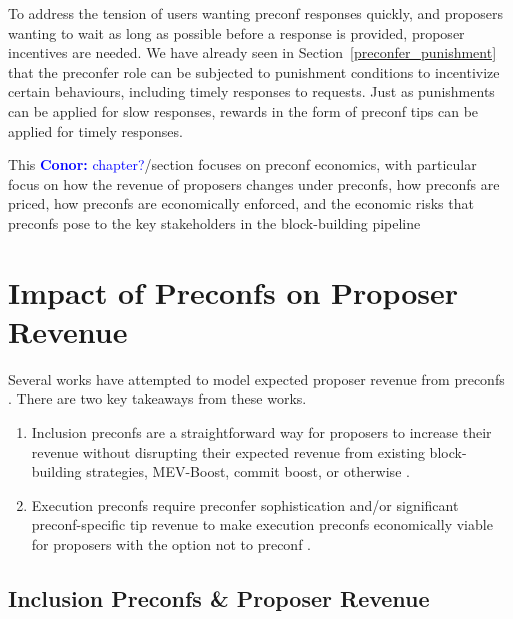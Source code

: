 \documentclass[a4paper]{article}
\theoremstyle{boldstyle}
\newcommand{\cm}[1]{\textcolor{blue}{\textbf{Conor:} #1}}
\newcommand{\todocm}[1]{\todo[color=blue!40]{\textbf{Conor:} #1}}
\begin{document}
    To address the tension of users wanting preconf responses quickly, and proposers wanting to wait as long as possible before a response is provided, proposer incentives are needed. We have already seen in Section~\ref{preconfer_punishment} that the preconfer role can be subjected to punishment conditions to incentivize certain behaviours, including timely responses to requests. Just as punishments can be applied for slow responses, rewards in the form of preconf tips can be applied for timely responses. 

    This \cm{chapter?}/section focuses on preconf economics, with particular focus on how the revenue of proposers changes under preconfs, how preconfs are priced, how preconfs are economically enforced, and the economic risks that preconfs pose to the key stakeholders in the block-building pipeline
\section{Impact of Preconfs on Proposer Revenue}
    
     Several works have attempted to model expected proposer revenue from preconfs\cite{W:PreconfirmationsundertheNOlens,W:EstimatingtheRevenuefromIndependentSub-SlotAuctionPreconfirmations,W:AnalysingExpectedProposerRevenuefromPreconfirmations,W:APricingModelforInclusionPreconfirmations} \todocm{identify other pricing works}. There are two key takeaways from these works.
     
     \begin{enumerate}
         \item Inclusion preconfs are a straightforward way for proposers to increase their revenue without disrupting their expected revenue from existing block-building strategies, MEV-Boost, commit boost, or otherwise \cite{W:APricingModelforInclusionPreconfirmations}.
         \item Execution preconfs require preconfer sophistication and/or significant preconf-specific tip revenue to make execution preconfs economically viable for proposers with the option not to preconf \cite{W:PreconfirmationsundertheNOlens,W:EstimatingtheRevenuefromIndependentSub-SlotAuctionPreconfirmations,W:AnalysingExpectedProposerRevenuefromPreconfirmations}. 
     \end{enumerate}
    
    \subsection{Inclusion Preconfs \& Proposer Revenue}
\end{document}
